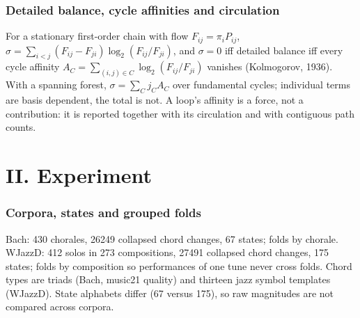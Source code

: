 \documentclass[11pt]{article}
\begin{document}
\section{Detailed balance, cycle affinities and circulation}
For a stationary first-order chain with flow $F_{ij}=\pi_iP_{ij}$, $\sigma=\sum_{i<j}(F_{ij}-F_{ji})\log_2(F_{ij}/F_{ji})$, and $\sigma=0$ iff detailed balance iff every cycle affinity $A_C=\sum_{(i,j)\in C}\log_2(F_{ij}/F_{ji})$ vanishes (Kolmogorov, 1936). With a spanning forest, $\sigma=\sum_C j_C A_C$ over fundamental cycles; individual terms are basis dependent, the total is not. A loop's affinity is a force, not a contribution: it is reported together with its circulation and with contiguous path counts.

\part*{II. Experiment}
\section{Corpora, states and grouped folds}
Bach: 430 chorales, 26249 collapsed chord changes, 67 states; folds by chorale. WJazzD: 412 solos in 273 compositions, 27491 collapsed chord changes, 175 states; folds by composition so performances of one tune never cross folds. Chord types are triads (Bach, music21 quality) and thirteen jazz symbol templates (WJazzD). State alphabets differ (67 versus 175), so raw magnitudes are not compared across corpora.
\end{document}
